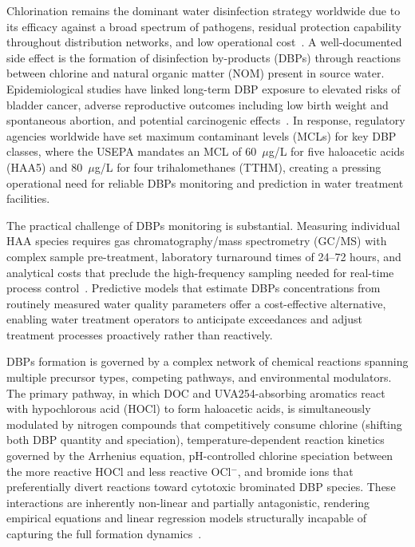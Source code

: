 \documentclass[runningheads]{llncs}
\begin{document}
Chlorination remains the dominant water disinfection strategy worldwide due to its efficacy against a broad spectrum of pathogens, residual protection capability throughout distribution networks, and low operational cost~\cite{deborde2008reactions,crittenden2012mwh}. A well-documented side effect is the formation of disinfection by-products (DBPs) through reactions between chlorine and natural organic matter (NOM) present in source water. Epidemiological studies have linked long-term DBP exposure to elevated risks of bladder cancer, adverse reproductive outcomes including low birth weight and spontaneous abortion, and potential carcinogenic effects~\cite{villanueva2004disinfection,richardson2007occurrence}. In response, regulatory agencies worldwide have set maximum contaminant levels (MCLs) for key DBP classes, where the USEPA mandates an MCL of 60~$\mu$g/L for five haloacetic acids (HAA5) and 80~$\mu$g/L for four trihalomethanes (TTHM), creating a pressing operational need for reliable DBPs monitoring and prediction in water treatment facilities.

The practical challenge of DBPs monitoring is substantial. Measuring individual HAA species requires gas chromatography/mass spectrometry (GC/MS) with complex sample pre-treatment, laboratory turnaround times of 24--72 hours, and analytical costs that preclude the high-frequency sampling needed for real-time process control~\cite{li2018drinking}. Predictive models that estimate DBPs concentrations from routinely measured water quality parameters offer a cost-effective alternative, enabling water treatment operators to anticipate exceedances and adjust treatment processes proactively rather than reactively.

DBPs formation is governed by a complex network of chemical reactions spanning multiple precursor types, competing pathways, and environmental modulators. The primary pathway, in which DOC and UVA254-absorbing aromatics react with hypochlorous acid (HOCl) to form haloacetic acids, is simultaneously modulated by nitrogen compounds that competitively consume chlorine (shifting both DBP quantity and speciation), temperature-dependent reaction kinetics governed by the Arrhenius equation, pH-controlled chlorine speciation between the more reactive HOCl and less reactive OCl$^-$, and bromide ions that preferentially divert reactions toward cytotoxic brominated DBP species. These interactions are inherently non-linear and partially antagonistic, rendering empirical equations and linear regression models structurally incapable of capturing the full formation dynamics~\cite{sohn2004disinfectant}.
\end{document}
